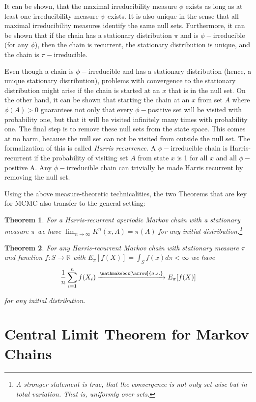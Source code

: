 \documentclass{book}
\theoremstyle{plain}%
\newtheorem{theorem}{Theorem}[section]
\theoremstyle{definition}
\newlength{\arrow}
\newcommand*{\myrightarrow}[1]{\xrightarrow{\mathmakebox[\arrow]{#1}}}
\begin{document}
It can be shown, that the maximal irreducibility measure $\phi$ exists as long as at least one irreducibility measure $\psi$ exists. It is also unique in the sense that all maximal irreducibility measures identify the same null sets. Furthermore, it can be shown that if the chain has a stationary distribution $\pi$ and is $\phi-$irreducible (for any $\phi$), then the chain is recurrent, the stationary distribution is unique, and the chain is $\pi-$irreducible.

Even though a chain is $\phi-$irreducible and has a stationary distribution (hence, a unique stationary distribution), problems with convergence to the stationary distribution might arise if the chain is started at an $x$ that is in the null set. On the other hand, it can be shown that starting the chain at an $x$ from set $A$ where $\phi(A) > 0$ guarantees not only that every $\phi-$positive set will be visited with probability one, but that it will be visited infinitely many times with probability one. The final step is to remove these null sets from the state space. This comes at no harm, because the null set can not be visited from outside the null set. The formalization of this is called \emph{Harris recurrence}. A $\phi-$irreducible chain is Harris-recurrent if the probability of visiting set $A$ from state $x$ is 1 for all $x$ and all $\phi-$positive A. Any $\phi-$irreducible chain can trivially be made Harris recurrent by removing the null set.

Using the above measure-theoretic technicalities, the two Theorems that are key for MCMC also transfer to the general setting:

\begin{theorem}
For a Harris-recurrent aperiodic Markov chain with a stationary measure $\pi$ we have $\lim_{n\rightarrow \infty} K^n(x,A) = \pi(A)$ for any initial distribution.\footnote{A stronger statement is true, that the convergence is not only set-wise but in total variation. That is, uniformly over sets.}
\end{theorem}

\begin{theorem} For any Harris-recurrent Markov chain with stationary measure $\pi$ and function $f: S \rightarrow \mathbb{R}$ with $E_{\pi}[f(X)] = \int_S f(x) d\pi < \infty$ we have
$$ \frac{1}{n} \sum_{i=1}^n f(X_i) \myrightarrow{a.s.} E_{\pi}[f(X)]$$

for any initial distribution.
\end{theorem}

\section{Central Limit Theorem for Markov Chains}
\end{document}
